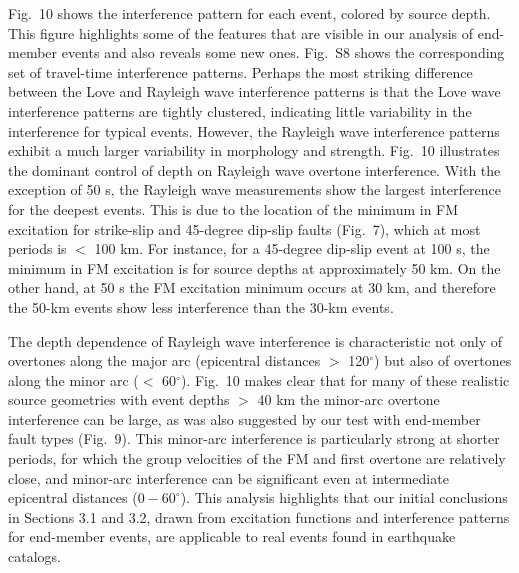 \documentclass[extra,mreferee]{gji}
\begin{document}
Fig.\ 10 shows the interference pattern for each event, colored by source depth. This figure highlights some of the features that are visible in our analysis of end-member events and also reveals some new ones. Fig.\ S8 shows the corresponding set of travel-time interference patterns. Perhaps the most striking difference between the Love and Rayleigh wave interference patterns is that the Love wave interference patterns are tightly clustered, indicating little variability in the interference for typical events. However, the Rayleigh wave interference patterns exhibit a much larger variability in morphology and strength. Fig.\ 10 illustrates the dominant control of depth on Rayleigh wave overtone interference. With the exception of 50 s, the Rayleigh wave measurements show the largest interference for the deepest events. This is due to the location of the minimum in FM excitation for strike-slip and 45-degree dip-slip faults (Fig.\ 7), which at most periods is $<$ 100 km. For instance, for a 45-degree dip-slip event at 100 s, the minimum in FM excitation is for source depths at approximately 50 km. On the other hand, at 50 s the FM excitation minimum occurs at 30 km, and therefore the 50-km events show less interference than the 30-km events. 

The depth dependence of Rayleigh wave interference is characteristic not only of overtones along the major arc (epicentral distances $>$ 120$^\circ$) but also of overtones along the minor arc ($<$ 60$^\circ$). Fig.\ 10 makes clear that for many of these realistic source geometries with event depths $>$ 40 km the minor-arc overtone interference can be large, as was also suggested by our test with end-member fault types (Fig.\ 9). This minor-arc interference is particularly strong at shorter periods, for which the group velocities of the FM and first overtone are relatively close, and minor-arc interference can be significant even at intermediate epicentral distances ($0-60^\circ$). This analysis highlights that our initial conclusions in Sections 3.1 and 3.2, drawn from excitation functions and interference patterns for end-member events, are applicable to real events found in earthquake catalogs.
\end{document}
